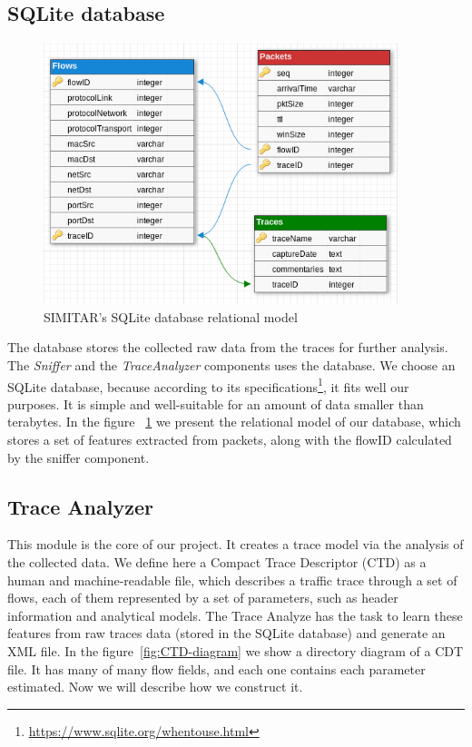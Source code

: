 \subsection{SQLite database}

\begin{figure}[ht!]
        \centering
        \includegraphics[height=3.0in]{figures/ch3/database-relational-model}
        \caption{SIMITAR's SQLite database relational model}
    \label{fig:simitar-database}
\end{figure}


The database stores the collected raw data from the traces for further analysis. The \textit{Sniffer} and the \textit{TraceAnalyzer} components uses the database.  We choose an SQLite database, because according to its specifications\footnote{\href{https://www.sqlite.org/whentouse.html}{https://www.sqlite.org/whentouse.html}}, it fits well our purposes. It is simple and well-suitable for an amount of data smaller than terabytes. In the figure ~\ref{fig:simitar-database} we present the relational model of our database, which stores a set of features extracted from packets, along with the flowID calculated by the sniffer component. 


\subsection{Trace Analyzer}


This module is the core of our project. It creates a trace model via the analysis of the collected data. We define here a Compact Trace Descriptor (CTD) as a human and machine-readable file, which describes a traffic trace through a set of flows, each of them represented by a set of parameters, such as header information and analytical models.  The Trace Analyze has the task to learn these features from raw traces data (stored in the SQLite database) and generate an XML file.  In the figure~\ref{fig:CTD-diagram} we show a directory diagram of a CDT file. It has many of many flow fields, and each one contains each parameter estimated. Now we will describe how we construct it. 


